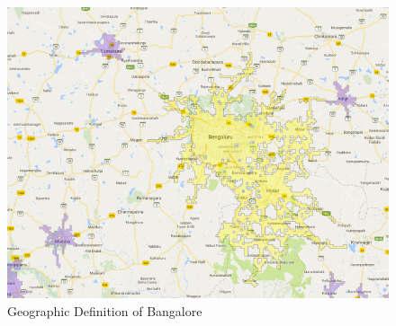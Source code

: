 \documentclass[12pt]{article}
\begin{document}
\begin{figure}[h]
\begin{centering}
  \includegraphics[width=\textwidth]{Bangalore}
  \caption{Geographic Definition of Bangalore}
   \label{fig:Bangalore}
\end{centering}
\end{figure}
\end{document}
